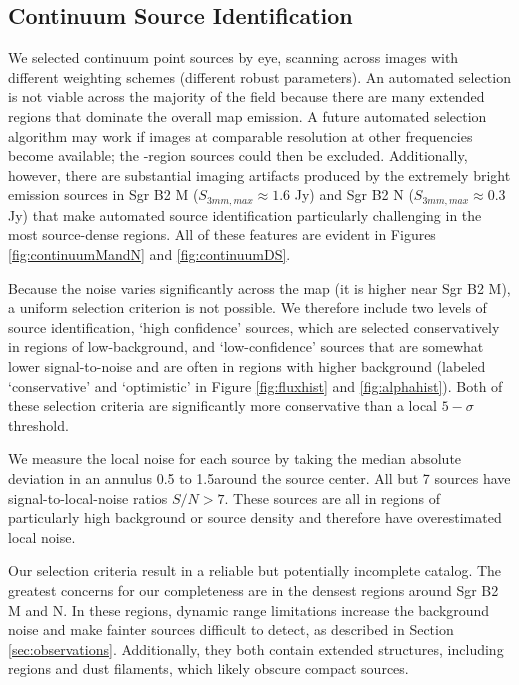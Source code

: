 \documentclass[twocolumn]{aastex61}
\begin{document}
\subsection{Continuum Source Identification}
\label{sec:contsources}
We selected continuum point sources by eye,
scanning across images with different weighting schemes (different robust
parameters).  An automated selection is not viable across the majority of the
field because there are many extended \hii regions that dominate the overall
map emission.  A future automated selection algorithm may work if images at
comparable resolution at other frequencies become available; the \hii-region
sources could then be excluded.  Additionally, however, there are substantial
imaging artifacts produced by the extremely bright emission sources in Sgr B2 M
($S_{3 mm,max} \approx 1.6$ Jy) and Sgr B2 N ($S_{3 mm,max} \approx 0.3$ Jy)
that make automated source identification particularly challenging in the most
source-dense regions.  All of these features are evident in Figures
\ref{fig:continuumMandN} and \ref{fig:continuumDS}.

Because the noise varies significantly across the map (it is higher near Sgr B2
M), a uniform selection criterion is not possible.  We therefore include two
levels of source identification, `high confidence' sources, which are selected
conservatively in regions of low-background, and `low-confidence' sources that
are somewhat lower signal-to-noise and are often in regions with higher
background (labeled `conservative' and `optimistic' in Figure
\ref{fig:fluxhist} and \ref{fig:alphahist}).  Both of these selection criteria
are significantly more conservative than a local $5-\sigma$ threshold.

We measure the local noise for each source by taking the median absolute
deviation in an annulus 0.5 to 1.5\arcsec around the source center.
All but 7 sources have signal-to-local-noise ratios $S/N>7$.  These
sources are all in regions of particularly high background or source
density and therefore have overestimated local noise.

Our selection criteria result in a reliable but potentially incomplete catalog.
The greatest concerns for our completeness are in the densest regions around
Sgr B2 M and N.  In these regions, dynamic range limitations increase the
background noise and make fainter sources difficult to detect, as described in
Section \ref{sec:observations}.  Additionally, they both contain extended
structures, including \hii regions and dust filaments, which likely obscure
compact sources.
\end{document}
